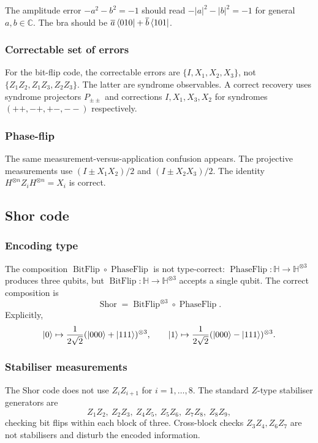 \documentclass[12pt]{article}
\theoremstyle{plain}
\theoremstyle{definition}
\begin{document}
The amplitude error $-a^2-b^2=-1$ should read $-|a|^2-|b|^2=-1$ for general $a,b\in\mathbb{C}$. The bra should be $\overline{a}\bra{010}+\overline{b}\bra{101}$.

\subsubsection*{Correctable set of errors}

For the bit-flip code, the correctable errors are $\{I,X_1,X_2,X_3\}$, not $\{Z_1Z_2,Z_1Z_3,Z_2Z_3\}$. The latter are syndrome observables. A correct recovery uses syndrome projectors $P_{\pm\pm}$ and corrections $I,X_1,X_3,X_2$ for syndromes $(++,-+,+-,--)$ respectively.

\subsubsection*{Phase-flip}

The same measurement-versus-application confusion appears. The projective measurements use $(I\pm X_1X_2)/2$ and $(I\pm X_2X_3)/2$. The identity $H^{\otimes n}Z_iH^{\otimes n}=X_i$ is correct.

\subsection{Shor code}

\subsubsection*{Encoding type}

The composition $\operatorname{BitFlip}\circ\operatorname{PhaseFlip}$ is not type-correct: $\operatorname{PhaseFlip}:\mathbb{H}\to\mathbb{H}^{\otimes 3}$ produces three qubits, but $\operatorname{BitFlip}:\mathbb{H}\to\mathbb{H}^{\otimes 3}$ accepts a single qubit. The correct composition is
\[
\operatorname{Shor}=\operatorname{BitFlip}^{\otimes 3}\circ\operatorname{PhaseFlip}.
\]
Explicitly,
\[
\ket{0}\mapsto\frac{1}{2\sqrt{2}}(\ket{000}+\ket{111})^{\otimes 3},\qquad \ket{1}\mapsto\frac{1}{2\sqrt{2}}(\ket{000}-\ket{111})^{\otimes 3}.
\]

\subsubsection*{Stabiliser measurements}

The Shor code does not use $Z_iZ_{i+1}$ for $i=1,\ldots,8$. The standard $Z$-type stabiliser generators are
\[
Z_1Z_2,\ Z_2Z_3,\ Z_4Z_5,\ Z_5Z_6,\ Z_7Z_8,\ Z_8Z_9,
\]
checking bit flips within each block of three. Cross-block checks $Z_3Z_4,Z_6Z_7$ are not stabilisers and disturb the encoded information.
\end{document}

